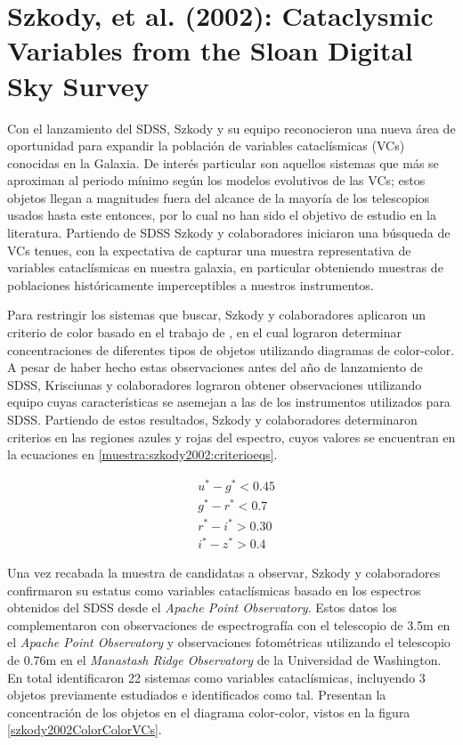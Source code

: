 \section{Szkody, et al. (2002): Cataclysmic Variables from the Sloan Digital Sky Survey} \label{muestra:szkody2002}

Con el lanzamiento del SDSS, Szkody y su equipo reconocieron una nueva área de
oportunidad para expandir la población de variables cataclísmicas (VCs)
conocidas en la Galaxia. De interés particular son aquellos sistemas que más se
aproximan al periodo mínimo según los modelos evolutivos de las VCs; estos
objetos llegan a magnitudes fuera del alcance de la mayoría de los telescopios
usados hasta este entonces, por lo cual no han sido el objetivo de estudio en la
literatura. Partiendo de SDSS Szkody y colaboradores iniciaron una búsqueda de
VCs tenues, con la expectativa de capturar una muestra representativa de
variables cataclísmicas en nuestra galaxia, en particular obteniendo muestras de
poblaciones históricamente imperceptibles a nuestros instrumentos.

Para restringir los sistemas que buscar, Szkody y colaboradores aplicaron un
criterio de color basado en el trabajo de \citet{krisciunas1998SdssCriteria}, en
el cual lograron determinar concentraciones de diferentes tipos de objetos
utilizando diagramas de color-color. A pesar de haber hecho estas observaciones
antes del año de lanzamiento de SDSS, Krisciunas y colaboradores lograron
obtener observaciones utilizando equipo cuyas características se asemejan a las
de los instrumentos utilizados para SDSS. Partiendo de estos resultados, Szkody
y colaboradores determinaron criterios en las regiones azules y rojas del
espectro, cuyos valores se encuentran en la ecuaciones en 
\ref{muestra:szkody2002:criterioeqs}.

\begin{equation} \label{muestra:szkody2002:criterioeqs}
	\begin{split}
		& u^* - g^* < 0.45 \\
		& g^* - r^* < 0.7 \\
		& r^* - i^* > 0.30 \\
		& i^* - z^* > 0.4
	\end{split}
\end{equation}

Una vez recabada la muestra de candidatas a observar, Szkody y colaboradores
confirmaron su estatus como variables cataclísmicas basado en los espectros
obtenidos del SDSS desde el \textit{Apache Point Observatory}. Estos datos los
complementaron con observaciones de espectrografía con el telescopio de 3.5m en
el \textit{Apache Point Observatory} y observaciones fotométricas utilizando el
telescopio de 0.76m en el \textit{Manastash Ridge Observatory} de la Universidad
de Washington. En total identificaron 22 sistemas como variables cataclísmicas,
incluyendo 3 objetos previamente estudiados e identificados como tal. Presentan
la concentración de los objetos en el diagrama color-color, vistos en la figura
\ref{szkody2002ColorColorVCs}. 

